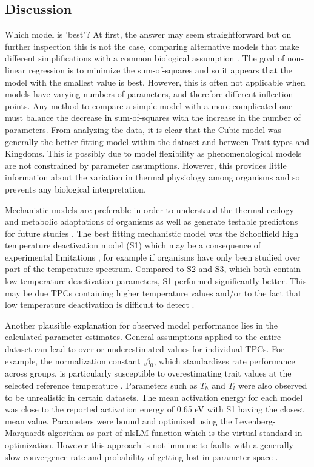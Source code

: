 \documentclass[11pt]{article}
\begin{document}
\begin{linenumbers}
\section{Discussion}

Which model is 'best'? At first, the answer may seem straightforward but on further inspection this is not the case, comparing alternative models that make different simplifications with a common biological assumption \cite{article}. The goal of non-linear regression is to minimize the sum-of-squares and so it appears that the model with the smallest value is best. However, this is often not applicable when  models have varying numbers of parameters, and therefore different inflection points. Any method to compare a simple model with a more complicated one must balance the decrease in sum-of-squares with the increase in the number of parameters. From analyzing the data, it is clear that the Cubic model was generally the better fitting model within the dataset and between Trait types and Kingdoms. This is possibly due to model flexibility as phenomenological models are not constrained by parameter assumptions. However, this provides little information about the variation in thermal physiology among organisms and so prevents any biological interpretation. 

Mechanistic models are preferable in order to understand the thermal ecology and metabolic adaptations of organisms as well as generate testable predictons for future studies
\cite{article4}\cite{Schulte2015TheEO} \cite{Martin2017PhenomenologicalVB} \cite{delong2017combined}. The best fitting mechanistic model was the Schoolfield high temperature deactivation model (S1) which may be a consequence of experimental limitations \cite{schoolfield1981non}, for example if organisms have only been studied over part of the temperature spectrum. Compared to S2 and S3, which both contain low temperature deactivation parameters, S1 performed significantly better. This may be due TPCs containing higher temperature values and/or to the fact that low temperature deactivation is difficult to detect \cite{pawar2016real}.

Another plausible explanation for observed model performance lies in the calculated parameter estimates. General assumptions applied to the entire dataset can lead to over or underestimated values for individual TPCs. For example, the normalization constant ,\(\beta_0\), which standardizes rate performance across groups, is particularly susceptible to overestimating trait values at the selected reference temperature \cite{kontopoulos2018use}. Parameters such as \(T_h\) and \(T_l\) were also observed to be unrealistic in certain datasets. The mean activation energy for each model was close to the reported activation energy of 0.65 eV with S1 having the closest mean value. Parameters were bound and optimized using the Levenberg-Marquardt algorithm as part of nlsLM function which is the virtual standard in optimization. However this approach is not immune to faults with a generally slow convergence rate and probability of getting lost in parameter space \cite{article14}.


\end{linenumbers}
\end{document}
